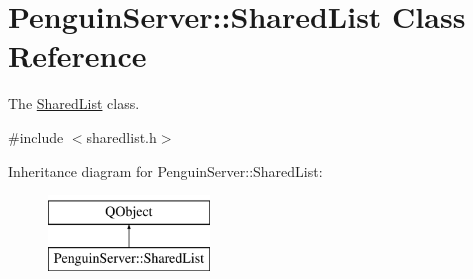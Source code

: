 \hypertarget{classPenguinServer_1_1SharedList}{\section{Penguin\-Server\-:\-:Shared\-List Class Reference}
\label{classPenguinServer_1_1SharedList}
}


The \hyperlink{classPenguinServer_1_1SharedList}{Shared\-List} class.  




{\ttfamily \#include $<$sharedlist.\-h$>$}

Inheritance diagram for Penguin\-Server\-:\-:Shared\-List\-:\begin{figure}[H]
\begin{center}
\leavevmode
\includegraphics[height=2.000000cm]{classPenguinServer_1_1SharedList}
\end{center}
\end{figure}
